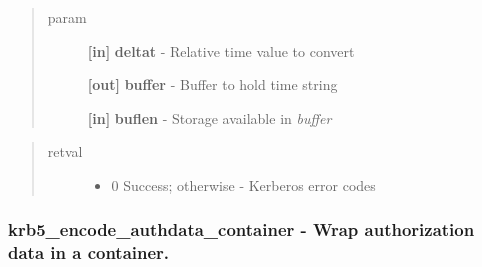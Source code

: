 \documentclass[letterpaper,10pt,english]{sphinxmanual}
\begin{document}
\begin{quote}\begin{description}
\item[{param}] \leavevmode
\textbf{{[}in{]}} \textbf{deltat} - Relative time value to convert

\textbf{{[}out{]}} \textbf{buffer} - Buffer to hold time string

\textbf{{[}in{]}} \textbf{buflen} - Storage available in \emph{buffer}

\end{description}\end{quote}
\begin{quote}\begin{description}
\item[{retval}] \leavevmode\begin{itemize}
\item {} 
0   Success; otherwise - Kerberos error codes

\end{itemize}

\end{description}\end{quote}


\subsubsection{krb5\_encode\_authdata\_container -  Wrap authorization data in a container.}
\label{appdev/refs/api/krb5_encode_authdata_container::doc}\label{appdev/refs/api/krb5_encode_authdata_container:krb5-encode-authdata-container-wrap-authorization-data-in-a-container}

\begin{fulllineitems}
\label{appdev/refs/api/krb5_encode_authdata_container:c.krb5_encode_authdata_container}
\end{fulllineitems}
\end{document}
